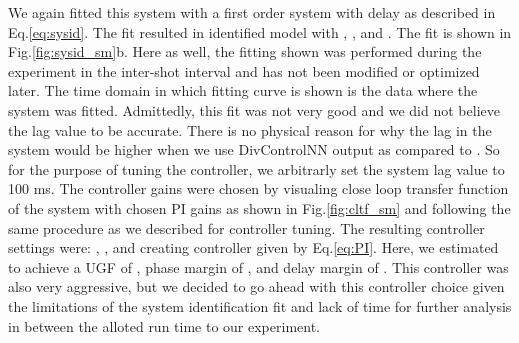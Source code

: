 We again fitted this system with a first order system with delay as described in Eq.\ref{eq:sysid}. The fit resulted in identified model with \SMK, \SMTau, and \SML. The fit is shown in Fig.\ref{fig:sysid_sm}b. Here as well, the fitting shown was performed during the experiment in the inter-shot interval and has not been modified or optimized later. The time domain in which fitting curve is shown is the data where the system was fitted. Admittedly, this fit was not very good and we did not believe the lag value to be accurate. There is no physical reason for why the lag in the system would be higher when we use DivControlNN output as compared to \Afrac. So for the purpose of tuning the controller, we arbitrarly set the system lag value to 100 ms. The controller gains were chosen by visualing close loop transfer function of the system with chosen PI gains as shown in Fig.\ref{fig:cltf_sm} and following the same procedure as we described for \Afrac controller tuning. The resulting controller settings were: \SMKp, \SMTi, and \SMstau{} creating controller given by Eq.\ref{eq:PI}. Here, we estimated to achieve a \ac{UGF} of \SMUGF, phase margin of \SMPhaseMargin, and delay margin of \SMDelayMargin. This controller was also very aggressive, but we decided to go ahead with this controller choice given the limitations of the system identification fit and lack of time for further analysis in between the alloted run time to our experiment.
